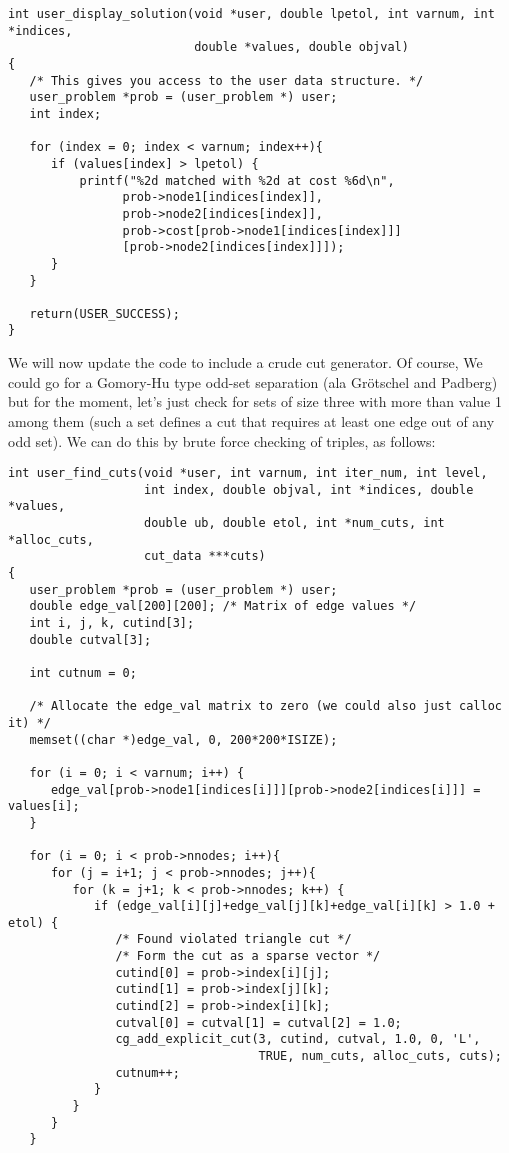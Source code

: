{{\color{Brown}
\begin{verbatim}
int user_display_solution(void *user, double lpetol, int varnum, int *indices,
                          double *values, double objval)
{
   /* This gives you access to the user data structure. */
   user_problem *prob = (user_problem *) user;
   int index;
 
   for (index = 0; index < varnum; index++){
      if (values[index] > lpetol) {
          printf("%2d matched with %2d at cost %6d\n",
                prob->node1[indices[index]],
                prob->node2[indices[index]],
                prob->cost[prob->node1[indices[index]]]
                [prob->node2[indices[index]]]);
      }	   
   }
   
   return(USER_SUCCESS);
}
\end{verbatim}
}

We will now update the code to include a crude cut generator. Of course, We
could go for a Gomory-Hu type odd-set separation (ala Gr\"otschel and Padberg)
but for the moment, let's just check for sets of size three with more than
value 1 among them (such a set defines a cut that requires at least one edge
out of any odd set). We can do this by brute force checking of triples, as
follows:

{\color{Brown}
\begin{verbatim}
int user_find_cuts(void *user, int varnum, int iter_num, int level,
                   int index, double objval, int *indices, double *values,
                   double ub, double etol, int *num_cuts, int *alloc_cuts, 
                   cut_data ***cuts)
{
   user_problem *prob = (user_problem *) user;
   double edge_val[200][200]; /* Matrix of edge values */
   int i, j, k, cutind[3];
   double cutval[3];
   
   int cutnum = 0;

   /* Allocate the edge_val matrix to zero (we could also just calloc it) */
   memset((char *)edge_val, 0, 200*200*ISIZE);
   
   for (i = 0; i < varnum; i++) {
      edge_val[prob->node1[indices[i]]][prob->node2[indices[i]]] = values[i];
   }
   
   for (i = 0; i < prob->nnodes; i++){
      for (j = i+1; j < prob->nnodes; j++){
         for (k = j+1; k < prob->nnodes; k++) {
            if (edge_val[i][j]+edge_val[j][k]+edge_val[i][k] > 1.0 + etol) {
               /* Found violated triangle cut */
               /* Form the cut as a sparse vector */
               cutind[0] = prob->index[i][j];
               cutind[1] = prob->index[j][k];
               cutind[2] = prob->index[i][k];
               cutval[0] = cutval[1] = cutval[2] = 1.0;
               cg_add_explicit_cut(3, cutind, cutval, 1.0, 0, 'L',
                                   TRUE, num_cuts, alloc_cuts, cuts);
               cutnum++;
            }
         }
      }
   }


\end{verbatim}}}
